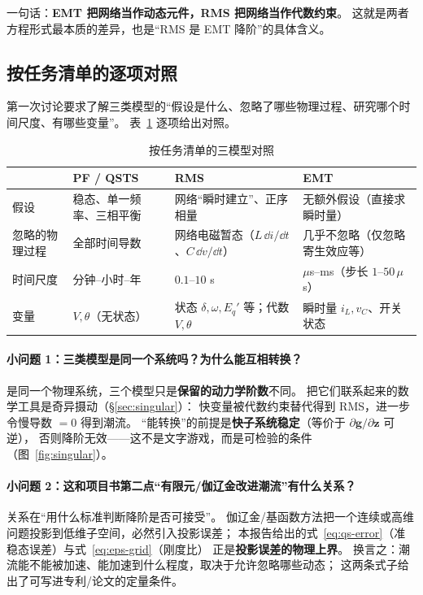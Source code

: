 一句话：\textbf{EMT 把网络当作动态元件，RMS 把网络当作代数约束}。
这就是两者方程形式最本质的差异，也是“RMS 是 EMT 降阶”的具体含义。

\subsection{按任务清单的逐项对照}

第一次讨论要求了解三类模型的“假设是什么、忽略了哪些物理过程、研究哪个时间尺度、有哪些变量”。
表~\ref{tab:four-questions} 逐项给出对照。

\begin{table}[htbp]
\centering
\caption{按任务清单的三模型对照}
\label{tab:four-questions}
\small
\renewcommand{\arraystretch}{1.15}
\begin{tabularx}{\textwidth}{@{}lXXX@{}}
\toprule
 & \textbf{PF / QSTS} & \textbf{RMS} & \textbf{EMT} \\
\midrule
假设 & 稳态、单一频率、三相平衡 & 网络“瞬时建立”、正序相量 & 无额外假设（直接求瞬时量） \\
忽略的物理过程 & 全部时间导数 & 网络电磁暂态（$L\,\dd i/\dd t$、$C\,\dd v/\dd t$） & 几乎不忽略（仅忽略寄生效应等） \\
时间尺度 & 分钟--小时--年 & $0.1$--$10$ s & $\mu$s--ms（步长 $1$--$50\,\mu$s） \\
变量 & $V,\theta$（无状态） & 状态 $\delta,\omega,E_q'$ 等；代数 $V,\theta$ & 瞬时量 $i_L,v_C$、开关状态 \\
\bottomrule
\end{tabularx}
\end{table}

\paragraph{小问题 1：三类模型是同一个系统吗？为什么能互相转换？}
是同一个物理系统，三个模型只是\textbf{保留的动力学阶数}不同。
把它们联系起来的数学工具是奇异摄动（\S\ref{sec:singular}）：
快变量被代数约束替代得到 RMS，进一步令慢导数 $=0$ 得到潮流。
“能转换”的前提是\textbf{快子系统稳定}（等价于 $\partial\bm{g}/\partial\bm{z}$ 可逆），
否则降阶无效——这不是文字游戏，而是可检验的条件（图~\ref{fig:singular}）。

\paragraph{小问题 2：这和项目书第二点“有限元/伽辽金改进潮流”有什么关系？}
关系在“用什么标准判断降阶是否可接受”。
伽辽金/基函数方法把一个连续或高维问题投影到低维子空间，必然引入投影误差；
本报告给出的式~\eqref{eq:qs-error}（准稳态误差）与式~\eqref{eq:eps-grid}（刚度比）
正是\textbf{投影误差的物理上界}。
换言之：潮流能不能被加速、能加速到什么程度，取决于允许忽略哪些动态；
这两条式子给出了可写进专利/论文的定量条件。

